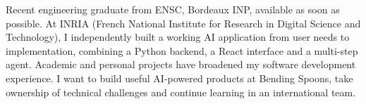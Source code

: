 
\begin{cvparagraph}
Recent engineering graduate from ENSC, Bordeaux INP, available as soon as possible. At INRIA (French National Institute for Research in Digital Science and Technology), I independently built a working AI application from user needs to implementation, combining a Python backend, a React interface and a multi-step agent. Academic and personal projects have broadened my software development experience. I want to build useful AI-powered products at Bending Spoons, take ownership of technical challenges and continue learning in an international team.
\end{cvparagraph}
